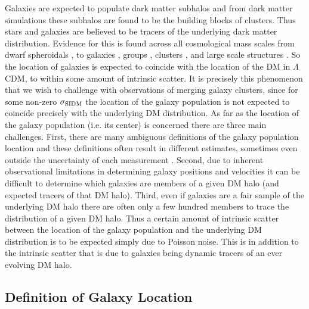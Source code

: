Galaxies are expected to populate dark matter subhalos \citep[e.g.][]{Yang:2012gg} and from dark matter simulations these subhalos are found to be the building blocks of clusters.
Thus stars and galaxies are believed to be tracers of the underlying dark matter distribution.
Evidence for this is found across all cosmological mass scales from dwarf spheroidals \citep[e.g.,][]{Walker:2013ha}, to galaxies \citep[e.g.,][]{Choi:2011wv, Choi:2012uo}, groups \citep[e.g.,][]{George:2012uo}, clusters \citep[e.g.,][]{Dahle:2000uz, vonderLinden:2012vq}, and large scale structures \citep[e.g.,][]{Dietrich:2012jq}.
So the location of galaxies is expected to coincide with the location of the DM in $\Lambda$CDM, to within some amount of intrinsic scatter.
It is precisely this phenomenon that we wish to challenge with observations of merging galaxy clusters, since for some non-zero $\sigma_{\rm SIDM}$ the location of the galaxy population is not expected to coincide precisely with the underlying DM distribution.
As far as the location of the galaxy population (i.e. its center) is concerned there are three main challenges.
First, there are many ambiguous definitions of the galaxy population location and these definitions often result in different estimates, sometimes even outside the uncertainty of each measurement \citep{George:2012uo}.
Second, due to inherent observational limitations in determining galaxy positions and velocities it can be difficult to determine which galaxies are members of a given DM halo (and expected tracers of that DM halo).
Third, even if galaxies are a fair sample of the underlying DM halo there are often only a few hundred members to trace the distribution of a given DM halo.
Thus a certain amount of intrinsic scatter between the location of the galaxy population and the underlying DM distribution is to be expected simply due to Poisson noise.
This is in addition to the intrinsic scatter that is due to galaxies being dynamic tracers of an ever evolving DM halo. 

\subsection{Definition of Galaxy Location}

